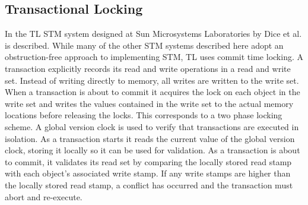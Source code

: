 \subsection{Transactional Locking }
In \cite{dice2006transactional} the TL \ac{STM} system designed at Sun Microsystems Laboratories by Dice et al. is described. While many of the other \ac{STM} systems described here adopt an obstruction-free approach to implementing \ac{STM}, TL uses commit time locking\cite[p. 199]{dice2006transactional}. A transaction explicitly records its read and write operations in a read and write set\cite[p. 198]{dice2006transactional}. Instead of writing directly to memory, all writes are written to the write set. When a transaction is about to commit it acquires the lock on each object in the write set and writes the values contained in the write set to the actual memory locations before releasing the locks\cite[p. 200]{dice2006transactional}. This corresponds to a two phase locking scheme\cite[p. 455]{tanenbaum2008modern}. A global version clock is used to verify that transactions are executed in isolation\cite[p. 201]{dice2006transactional}. As a transaction starts it reads the current value of the global version clock, storing it locally so it can be used for validation. As a transaction is about to commit, it validates its read set by comparing the locally stored read stamp with each object's associated write stamp\cite[p. 200]{dice2006transactional}. If any write stamps are higher than the locally stored read stamp, a conflict has occurred and the transaction must abort and re-execute.


